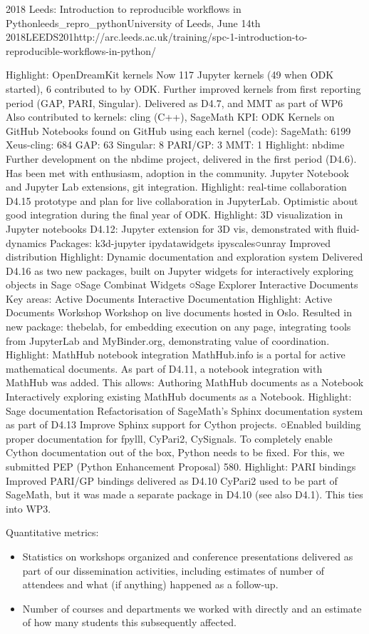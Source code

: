 \begin{Aim 1}
\begin{Aim 2}
\begin{event}{2018 Leeds: Introduction to reproducible workflows in Python}{leeds_repro_python}{University of Leeds, June 14th 2018}{LEEDS}{20}{1}{http://arc.leeds.ac.uk/training/spc-1-introduction-to-reproducible-workflows-in-python/}
\begin{itemize}
Highlight: OpenDreamKit kernels
Now 117 Jupyter kernels (49 when ODK started), 6 contributed to by ODK.
Further improved kernels from first reporting period (GAP, PARI, Singular). 
Delivered as D4.7, and MMT as part of WP6
Also contributed to kernels: cling (C++), SageMath
KPI: ODK Kernels on GitHub
Notebooks found on GitHub using each kernel (code):
SageMath: 6199
Xeus-cling: 684
GAP: 63
Singular: 8
PARI/GP: 3
MMT: 1
Highlight: nbdime
Further development on the nbdime project, delivered in the first period 
(D4.6). Has been met with enthusiasm, adoption in the community.
Jupyter Notebook and Jupyter Lab extensions, git integration.
Highlight: real-time collaboration
D4.15 prototype and plan for live collaboration in JupyterLab.
Optimistic about good integration during the final year of ODK.
Highlight: 3D visualization in Jupyter notebooks
D4.12: Jupyter extension for 3D vis, demonstrated with fluid-dynamics
Packages:
k3d-jupyter
ipydatawidgets
ipyscales○unray
Improved distribution
Highlight: Dynamic documentation and exploration system
Delivered D4.16 as two new packages, 
built on Jupyter widgets for interactively 
exploring objects in Sage
○Sage Combinat Widgets
○Sage Explorer
Interactive Documents
Key areas:
Active Documents
Interactive Documentation
Highlight: Active Documents Workshop
Workshop on live documents hosted in Oslo. Resulted in new package: 
thebelab, for embedding execution on any page, integrating tools from 
JupyterLab and MyBinder.org, demonstrating value of coordination.
Highlight: MathHub notebook integration
MathHub.info is a portal for active mathematical documents. As part of D4.11, a 
notebook integration with MathHub was added. This allows:
Authoring MathHub documents as a Notebook
Interactively exploring existing MathHub documents as a Notebook.
Highlight: Sage documentation
Refactorisation of SageMath’s Sphinx documentation system as part of D4.13
Improve Sphinx support for Cython projects.
○Enabled building proper documentation for fpylll, CyPari2, CySignals.
To completely enable Cython documentation out of the box, Python needs to 
be fixed. For this, we submitted PEP (Python Enhancement Proposal) 580.
Highlight: PARI bindings
Improved PARI/GP bindings delivered as D4.10
CyPari2 used to be part of SageMath, but it was made a separate package in 
D4.10 (see also D4.1). This ties into WP3.


Quantitative metrics:
\begin{itemize}
\item Statistics on workshops organized and conference presentations
  delivered as part of our dissemination activities, including
  estimates of number of attendees and what (if anything) happened as
  a follow-up.
\item Number of courses and departments we worked with directly and an
  estimate of how many students this subsequently affected.


\end{itemize}
\end{itemize}
\end{event}
\end{Aim 2}
\end{Aim 1}
